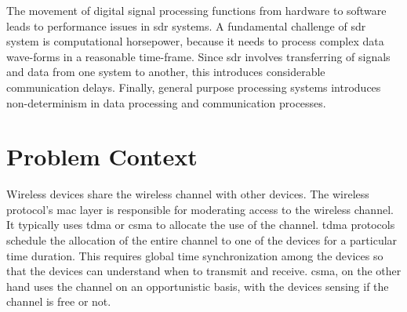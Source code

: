 
The movement of digital signal processing functions from hardware to software leads to performance issues in \ac{sdr} systems.
A fundamental challenge of \ac{sdr} system is computational horsepower, because it needs to process complex data wave-forms in a reasonable time-frame. Since \ac{sdr} involves transferring of signals and data from one system to another, this introduces considerable communication delays. Finally, general purpose processing systems introduces non-determinism in data processing and communication processes.\\


\section{Problem Context}
Wireless devices share the wireless channel with other devices. The wireless protocol's \ac{mac} layer is responsible for moderating access to the wireless channel. It typically uses \ac{tdma} or \ac{csma} to allocate the use of the channel. \ac{tdma} protocols schedule the allocation of the entire channel to one of the devices for a particular time duration. This requires global time synchronization among the devices so that the devices can understand when to transmit and receive. \ac{csma}, on the other hand uses the channel on an opportunistic basis, with the devices sensing if the channel is free or not.\\

